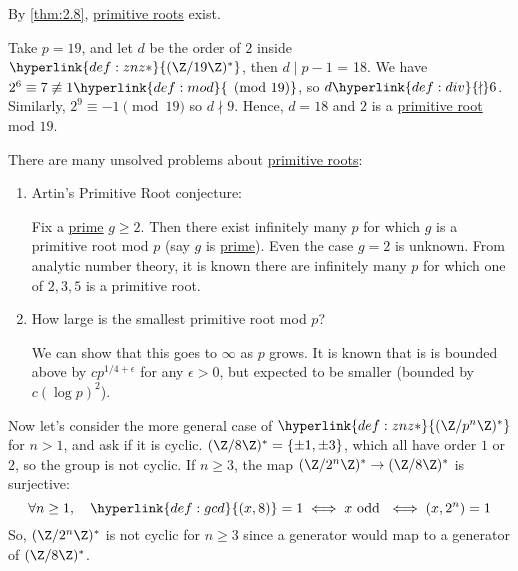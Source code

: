 \documentclass{article}
\begin{document}


By \cref{thm:2.8}, \hyperlink{def:primRoot}{primitive roots} exist.

\begin{eg}
    Take $p = 19$, and let $d$ be the order of $2$ inside $\hyperlink{def:znz*}{(\Z/19\Z)^*}$, then $d \mid p-1$ = 18.
    We have $2^6 \equiv 7 \not\equiv 1 \hyperlink{def:mod}{\pmod{19}}$, so $d \hyperlink{def:div}{\nmid} 6$.
    Similarly, $2^9 \equiv -1 \pmod{19}$ so $d \nmid 9$.  Hence, $d=18$ and $2$ is a \hyperlink{def:primRoot}{primitive root} mod $19$.
\end{eg}

There are many unsolved problems about \hyperlink{def:primRoot}{primitive roots}:
\begin{enumerate}
    \item Artin's Primitive Root conjecture:

        Fix a \hyperlink{def:prime}{prime} $g \geq 2$. Then there exist infinitely many $p$ for which $g$ is a primitive root mod $p$ (say $g$ is \hyperlink{def:prime}{prime}).
        Even the case $g=2$ is unknown.
        From analytic number theory, it is known there are infinitely many $p$ for which one of $2, 3, 5$ is a primitive root.
    \item How large is the smallest primitive root mod $p$?

        We can show that this goes to $\infty$ as $p$ grows.
        It is known that is is bounded above by $c p^{1/4 + \epsilon}$ for any $\epsilon > 0$, but expected to be smaller (bounded by $c (\log p)^2$).
\end{enumerate}

Now let's consider the more general case of $\hyperlink{def:znz*}{(\Z / p^n \Z)^*}$ for $n > 1$, and ask if it is cyclic.
$(\Z / 8 \Z)^* = \{\pm 1, \pm 3\}$, which all have order $1$ or $2$, so the group is not cyclic.
If $n \geq 3$, the map $(\Z/2^n \Z)^* \to (\Z/8 \Z)^*$ is surjective:
\begin{equation*}\forall n \geq 1, \quad \hyperlink{def:gcd}{(x, 8)} = 1 \iff x \text{ odd } \iff (x, 2^n) = 1 \end{equation*}
So, $(\Z/2^n \Z)^*$ is not cyclic for $n \geq 3$ since a generator would map to a generator of $(\Z / 8 \Z)^*$.
\end{document}
